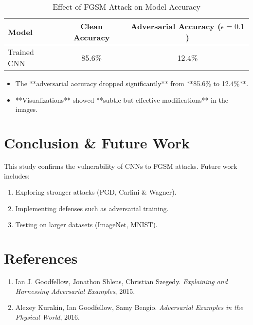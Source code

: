 \documentclass{article}
\begin{document}
\begin{table}[h]
    \centering
    \begin{tabular}{lcc}
        \toprule
        \textbf{Model} & \textbf{Clean Accuracy} & \textbf{Adversarial Accuracy (\(\epsilon=0.1\))} \\
        \midrule
        Trained CNN & 85.6\% & 12.4\% \\
        \bottomrule
    \end{tabular}
    \caption{Effect of FGSM Attack on Model Accuracy}
    \label{tab:results}
\end{table}

\begin{itemize}
    \item The **adversarial accuracy dropped significantly** from **85.6\% to 12.4\%**.
    \item **Visualizations** showed **subtle but effective modifications** in the images.
\end{itemize}

\section{Conclusion \& Future Work}
This study confirms the vulnerability of CNNs to FGSM attacks. Future work includes:
\begin{enumerate}
    \item Exploring stronger attacks (PGD, Carlini \& Wagner).
    \item Implementing defenses such as adversarial training.
    \item Testing on larger datasets (ImageNet, MNIST).
\end{enumerate}

\section{References}
\begin{enumerate}
    \item Ian J. Goodfellow, Jonathon Shlens, Christian Szegedy. \textit{Explaining and Harnessing Adversarial Examples}, 2015.
    \item Alexey Kurakin, Ian Goodfellow, Samy Bengio. \textit{Adversarial Examples in the Physical World}, 2016.
\end{enumerate}
\end{document}
